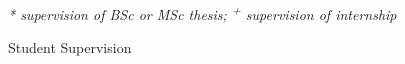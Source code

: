

\cventry
    {\begin{small}\textit{* supervision of BSc or MSc thesis; \textsuperscript{+} supervision of internship}\end{small}} %
    {Student Supervision} %
    {} %
    {} %
    {
    }

